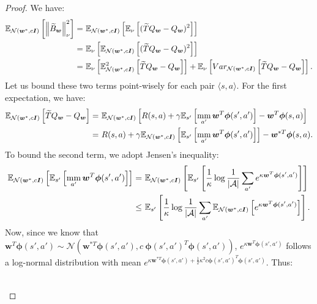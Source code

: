 \documentclass{article}
\newcommand{\mm}{\operatornamewithlimits{mm}}
\newcommand{\wt}[1]{\widetilde{#1}}
\newcommand{\norm}[1]{\left\lVert #1 \right\rVert}
\begin{document}
\begin{proof}
We have:
\begin{align}\label{eq:thg-3}
\mathbb{E}_{\mathcal{N}(\bm{w}^*,c\bm{I})}\left[\norm{\wt{B}_{\bm{w}}}_{\nu}^2\right] =\ & \mathbb{E}_{\mathcal{N}(\bm{w}^*,c\bm{I})}\left[\mathbb{E}_{\nu}\left[(\wt{T}Q_{\bm{w}}-Q_{\bm{w}})^2\right]\right]\notag\\ =\ & \mathbb{E}_{\nu}\left[\mathbb{E}_{\mathcal{N}(\bm{w}^*,c\bm{I})}\left[(\wt{T}Q_{\bm{w}}-Q_{\bm{w}})^2\right]\right]\notag\\ =\ & \mathbb{E}_{\nu}\left[\mathbb{E}_{\mathcal{N}(\bm{w}^*,c\bm{I})}^2\left[\wt{T}Q_{\bm{w}}-Q_{\bm{w}}\right]\right]+ \mathbb{E}_{\nu}\left[Var_{\mathcal{N}(\bm{w}^*,c\bm{I})}\left[\wt{T}Q_{\bm{w}}-Q_{\bm{w}}\right]\right].
\end{align}
Let us bound these two terms point-wisely for each pair $\langle s,a\rangle$. For the first expectation, we have:
\begin{align}\label{eq:thg-1}
\mathbb{E}_{\mathcal{N}(\bm{w}^*,c\bm{I})}\left[\wt{T}Q_{\bm{w}}-Q_{\bm{w}}\right] =\ & \mathbb{E}_{\mathcal{N}(\bm{w}^*,c\bm{I})}\left[R(s,a) + \gamma\mathbb{E}_{s'}\left[\mm_{a'}\bm{w}^T\bm{\phi}(s',a')\right] - \bm{w}^T\bm{\phi}(s,a)\right]\notag\\ =\ & R(s,a) + \gamma\mathbb{E}_{\mathcal{N}(\bm{w}^*,c\bm{I})}\left[\mathbb{E}_{s'}\left[\mm_{a'}\bm{w}^T\bm{\phi}(s',a')\right]\right] - \bm{w}^{*T}\bm{\phi}(s,a).
\end{align}
To bound the second term, we adopt Jensen's inequality:
\begin{align}\label{eq:thg-2}
\mathbb{E}_{\mathcal{N}(\bm{w}^*,c\bm{I})}\left[\mathbb{E}_{s'}\left[\mm_{a'}\bm{w}^T\bm{\phi}(s',a')\right]\right] =\ & \mathbb{E}_{\mathcal{N}(\bm{w}^*,c\bm{I})}\left[\mathbb{E}_{s'}\left[\frac{1}{\kappa} \log \frac{1}{|\mathcal{A}|}\sum_{a'} e^{\kappa\bm{w}^T\bm{\phi}(s',a') }\right]\right]\notag\\ \leq\ & \mathbb{E}_{s'}\left[\frac{1}{\kappa} \log \frac{1}{|\mathcal{A}|}\sum_{a'} \mathbb{E}_{\mathcal{N}(\bm{w}^*,c\bm{I})}\left[e^{\kappa\bm{w}^T\bm{\phi}(s',a')}\right]\right].
\end{align}
Now, since we know that $\bm{w}^T\bm{\phi}(s',a') \sim \mathcal{N}(\bm{w}^{*T}\bm{\phi}(s',a'),c\ \bm{\phi}(s',a')^T\bm{\phi}(s',a'))$, $e^{\kappa\bm{w}^T\bm{\phi}(s',a')}$ follows a log-normal distribution with mean $e^{\kappa\bm{w}^{*T}\bm{\phi}(s',a') + \frac{1}{2}\kappa^2c\bm{\phi}(s',a')^T\bm{\phi}(s',a')}$. Thus:
\begin{small}
\begin{align*}

\end{align*}
\end{small}
\end{proof}
\end{document}
